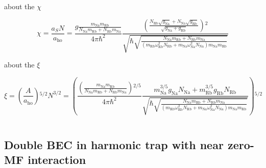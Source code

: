 about the $\chi $

\begin{equation}\chi =\frac{a_SN}{a_{\text{ho}}}=\frac{g \frac{m_{\text{Na}}m_{\text{Rb}}}{N_{\text{Na}}m_{\text{Rb}}+N_{\text{Rb}}m_{\text{Na}}}}{4\pi  \hbar
^2}\frac{\left(\frac{N_{\text{Rb}}\sqrt{g_{\text{Na}}}+N_{\text{Na}}\sqrt{g_{\text{Rb}}}}{\sqrt{g_{\text{Na}}+g_{\text{Rb}}}}\right){}^2}{\sqrt{\hbar
\sqrt{\frac{N_{\text{Na}}m_{\text{Rb}}+N_{\text{Rb}}m_{\text{Na}}}{\left(m_{\text{Rb}} \omega _{\text{Rb}}^2N_{\text{Rb}}+m_{\text{Na}} \omega _{\text{Na}}^2N_{\text{Na}}\right)m_{\text{Na}}m_{\text{Rb}}}}}}\end{equation}

about the $\xi $

\begin{equation}\xi =\left(\frac{A}{a_{\text{ho}}}\right){}^{5/2}N^{3/2}=\left(\frac{\left(\frac{ m_{\text{Na}}m_{\text{Rb}}}{N_{\text{Na}}m_{\text{Rb}}+N_{\text{Rb}}m_{\text{Na}}}\right){}^{2/5}}{4\pi
 \hbar ^2}\frac{m_{\text{Na}}^{3/5}g_{\text{Na}}N_{\text{Na}}+m_{\text{Rb}}^{3/5}g_{\text{Rb}}N_{\text{Rb}}}{\sqrt{\hbar \sqrt{\frac{N_{\text{Na}}m_{\text{Rb}}+N_{\text{Rb}}m_{\text{Na}}}{\left(m_{\text{Rb}}
\omega _{\text{Rb}}^2N_{\text{Rb}}+m_{\text{Na}} \omega _{\text{Na}}^2N_{\text{Na}}\right)m_{\text{Na}}m_{\text{Rb}}}}}}\right){}^{5/2}\end{equation}

\begin{equation}\text{}\end{equation}

\subsection{Double BEC in harmonic trap with near zero-MF interaction }

